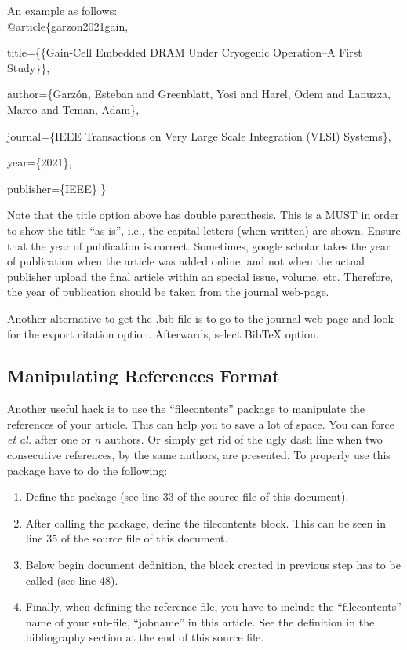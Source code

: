 \documentclass[conference]{IEEEtran}
\begin{document}
An example as follows:\\

@article\{garzon2021gain,

  title=\{\{Gain-Cell Embedded DRAM Under Cryogenic Operation--A First Study\}\},
  
  author=\{Garz{\'o}n, Esteban and Greenblatt, Yosi and Harel, Odem and Lanuzza, Marco and Teman, Adam\},
  
  journal=\{IEEE Transactions on Very Large Scale Integration (VLSI) Systems\},
  
  year=\{2021\},
  
  publisher=\{IEEE\}
\}
    
Note that the title option above has double parenthesis.
This is a MUST in order to show the title ``as is'', i.e., the capital letters (when written) are shown.
Ensure that the year of publication is correct.
Sometimes, google scholar takes the year of publication when the article was added online, and not when the actual publisher upload the final article within an special issue, volume, etc.
Therefore, the year of publication should be taken from the journal web-page.

Another alternative to get the .bib file is to go to the journal web-page and look for the export citation option.
Afterwards, select BibTeX option. 

\subsection{Manipulating References Format}
Another useful hack is to use the ``filecontents'' package to manipulate the references of your article. 
This can help you to save a lot of space.
You can force \textit{et al.} after one or $n$ authors. 
Or simply get rid of the ugly dash line when two consecutive references, by the same authors, are presented. 
To properly use this package have to do the following:
\begin{enumerate}
    \item Define the package (see line 33 of the source file of this document).
    \item After calling the package, define the filecontents block. 
    This can be seen in line 35 of the source file of this document.
    \item Below begin document definition, the block created in previous step has to be called (see line 48).
    \item Finally, when defining the reference file, you have to include the ``filecontents'' name of your sub-file, ``jobname'' in this article.
    See the definition in the bibliography section at the end of this source file. 
\end{enumerate}
\end{document}
